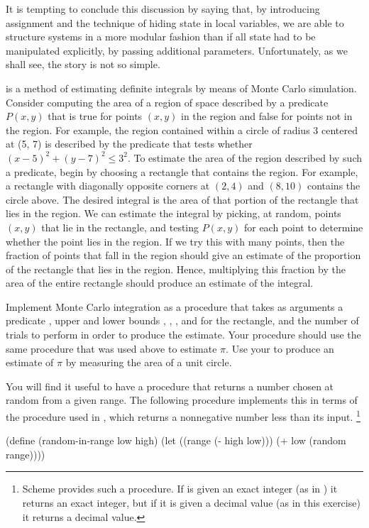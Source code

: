 It is tempting to conclude this discussion by saying that, by introducing assignment and the technique of hiding state in local variables, we are able to structure systems in a more modular fashion than if all state had to be manipulated explicitly, by passing additional parameters.
Unfortunately, as we shall see, the story is not so simple.

\begin{exercise}
	\label{Exercise 3.5}
	 is a method of estimating definite integrals by means of Monte Carlo simulation.
	Consider computing the area of a region of space described by a predicate \( P(x, y) \) that is true for points \( (x, y) \) in the region and false for points not in the region.
	For example, the region contained within a circle of radius 3 centered at (5, 7) is described by the predicate that tests whether \( (x - 5)^2 + (y - 7)^2 ≤ 3^2 \).
	To estimate the area of the region described by such a predicate, begin by choosing a rectangle that contains the region.
	For example, a rectangle with diagonally opposite corners at \( (2, 4) \) and \( (8, 10) \) contains the circle above.
	The desired integral is the area of that portion of the rectangle that lies in the region.
	We can estimate the integral by picking, at random, points \( (x, y) \) that lie in the rectangle, and testing \( P(x, y) \) for each point to determine whether the point lies in the region.
	If we try this with many points, then the fraction of points that fall in the region should give an estimate of the proportion of the rectangle that lies in the region.
	Hence, multiplying this fraction by the area of the entire rectangle should produce an estimate of the integral.

	Implement Monte Carlo integration as a procedure  that takes as arguments a predicate , upper and lower bounds , , , and  for the rectangle, and the number of trials to perform in order to produce the estimate.
	Your procedure should use the same  procedure that was used above to estimate \( π \).
	Use your  to produce an estimate of \( π \) by measuring the area of a unit circle.

	You will find it useful to have a procedure that returns a number chosen at random from a given range.
	The following  procedure implements this in terms of the  procedure used in , which returns a nonnegative number less than its input.%
	\footnote{
		 Scheme provides such a procedure.
		If  is given an exact integer (as in ) it returns an exact integer, but if it is given a decimal value (as in this exercise) it returns a decimal value.
	}
	\begin{scheme}
	  (define (random-in-range low high)
	    (let ((range (- high low)))
	      (+ low (random range))))
	\end{scheme}
\end{exercise}



